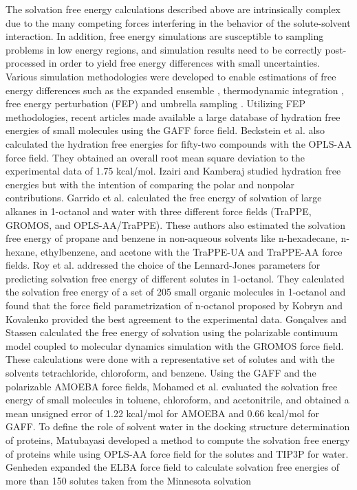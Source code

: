 \documentclass[final,12p,times,twocolumn]{elsarticle}
\begin{document}
	The solvation free energy calculations described above are intrinsically complex due to the many competing forces interfering in the behavior of the solute-solvent interaction. In addition, free energy simulations are susceptible to sampling problems in low energy regions, and simulation results need to be correctly post-processed in order to yield free energy differences with small uncertainties. {Various simulation methodologies were developed to enable estimations of free energy differences} such as the expanded ensemble \cite{lyubartsev}, thermodynamic integration \cite{kirkwood1935}, free energy perturbation (FEP) \cite{zwanzig1954,bennet1976,mbar} and umbrella sampling \cite{TORRIE1977187}.  Utilizing  FEP methodologies, recent articles \cite{PMID:24928188,mobley2017} made available a large database of hydration free energies of small molecules using the GAFF force field. Beckstein et al. \cite{Beckstein2014} also calculated the hydration free energies for fifty-two compounds with the OPLS-AA force field. They obtained an overall root mean square deviation to the experimental data of 1.75 kcal/mol. Izairi and Kamberaj \cite{izairi2017} studied hydration free energies but with the intention of comparing the polar and nonpolar contributions. Garrido et al. \cite{garrido,garrido2011} calculated the free energy of solvation of large alkanes in 1-octanol and water with three different force fields (TraPPE, GROMOS, and OPLS-AA/TraPPE). These authors also estimated the solvation free energy of propane and benzene in non-aqueous solvents like n-hexadecane, n-hexane, ethylbenzene, and acetone with the TraPPE-UA and TraPPE-AA force fields. Roy et al. \cite{roy2017}  addressed the choice of the Lennard-Jones parameters for predicting solvation free energy of different solutes in 1-octanol. They calculated the solvation free energy of a set of 205 small organic molecules in 1-octanol and found that the force field parametrization of n-octanol proposed by  Kobryn and Kovalenko \cite{doi:10.1063/1.2972978} provided the best agreement to the experimental data. Gon\c{c}alves and
	Stassen  \cite{goncalves} calculated the free energy of solvation using the polarizable continuum model coupled to molecular dynamics simulation with the GROMOS force field. These calculations were done with a representative set of solutes and with the solvents tetrachloride, chloroform, and benzene. Using the GAFF and the polarizable AMOEBA force fields, Mohamed et al.  \cite{mohamed2016} evaluated the solvation free energy of small molecules in toluene, chloroform, and acetonitrile, and obtained a mean unsigned error of 1.22 kcal/mol for AMOEBA and 0.66 kcal/mol for GAFF. To define the role of solvent water in the docking structure determination of proteins, Matubayasi  \cite{MATUBAYASI201745} developed a method to compute the solvation free energy of proteins while using OPLS-AA force field for the solutes and TIP3P for water. Genheden \cite{doi:10.1021/acs.jctc.5b00963} expanded the ELBA force field to calculate solvation free energies of more than 150 solutes taken from the Minnesota solvation
\end{document}
